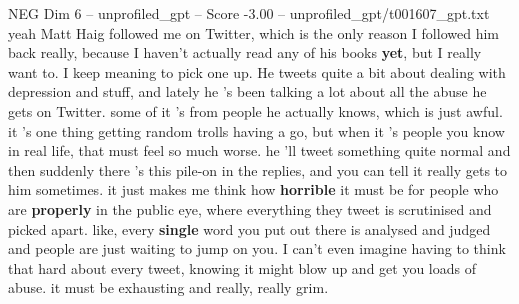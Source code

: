 \begin{textsample}{NEG Dim 6 – unprofiled\_gpt – Score -3.00 – unprofiled\_gpt/t001607\_gpt.txt}  \label{ex:f6_neg_022}
yeah Matt Haig followed me on Twitter, which is the only reason I followed him back really, because I haven't actually read any of his books \textbf{yet}, but I really want to.
I keep meaning to pick one up.
He tweets quite a bit about dealing with depression and stuff, and lately he ’s been talking a lot about all the abuse he gets on Twitter. some of it ’s from people he actually knows, which is just awful. it ’s one thing getting random trolls having a go, but when it ’s people you know in real life, that must feel so much worse. he ’ll tweet something quite normal and then suddenly there ’s this pile-on in the replies, and you can tell it really gets to him sometimes. it just makes me think how \textbf{horrible} it must be for people who are \textbf{properly} in the public eye, where everything they tweet is scrutinised and picked apart. like, every \textbf{single} word you put out there is analysed and judged and people are just waiting to jump on you.
I can't even imagine having to think that hard about every tweet, knowing it might blow up and get you loads of abuse. it must be exhausting and really, really grim.

\end{textsample}
